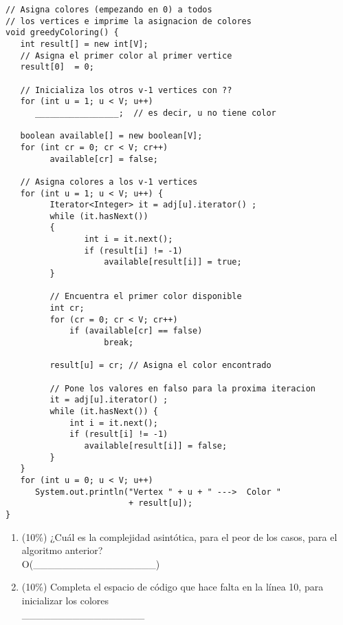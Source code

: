 \documentclass[10 pt]{article}
\begin{document}
\pagebreak

\begin{lstlisting}
// Asigna colores (empezando en 0) a todos 
// los vertices e imprime la asignacion de colores
void greedyColoring() {
   int result[] = new int[V];
   // Asigna el primer color al primer vertice
   result[0]  = 0;

   // Inicializa los otros v-1 vertices con ??
   for (int u = 1; u < V; u++)
      _________________;  // es decir, u no tiene color

   boolean available[] = new boolean[V];
   for (int cr = 0; cr < V; cr++)
         available[cr] = false;
 
   // Asigna colores a los v-1 vertices
   for (int u = 1; u < V; u++) {
         Iterator<Integer> it = adj[u].iterator() ;
         while (it.hasNext())
         {
                int i = it.next();
                if (result[i] != -1)
                    available[result[i]] = true;
         }
 
         // Encuentra el primer color disponible
         int cr;
         for (cr = 0; cr < V; cr++)
             if (available[cr] == false)
                    break;
 
         result[u] = cr; // Asigna el color encontrado
 
         // Pone los valores en falso para la proxima iteracion
         it = adj[u].iterator() ;
         while (it.hasNext()) {
             int i = it.next();
             if (result[i] != -1)
                available[result[i]] = false;
         }
   }
   for (int u = 0; u < V; u++)
      System.out.println("Vertex " + u + " --->  Color "
                         + result[u]);
}
 \end{lstlisting}


\begin{enumerate}[label=\alph*]


    \item (10\%) ¿Cuál es la complejidad asintótica, para el peor de los casos, para el algoritmo anterior? \\


  O(\_\_\_\_\_\_\_\_\_\_\_\_\_\_\_\_\_)

  \item (10\%) Completa el espacio de código que hace falta en la línea 10, para inicializar los colores \\

\_\_\_\_\_\_\_\_\_\_\_\_\_\_\_\_\_   

\end{enumerate}
\end{document}
